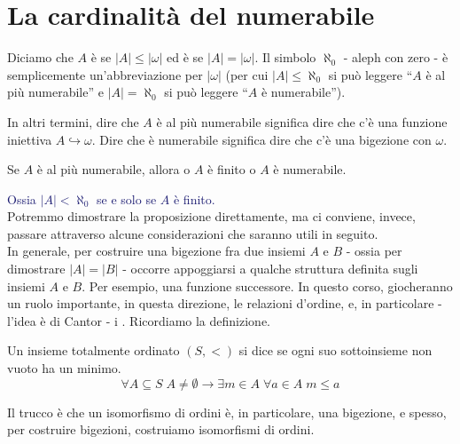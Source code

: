 \section{La cardinalità del numerabile}

\begin{definition}[Numerabilità]
	Diciamo che $A$ è  se $|A| \leq |\omega|$ ed è  se $|A| = |\omega|$.
	Il simbolo $\aleph_0$ - aleph con zero - è semplicemente un'abbreviazione per $|\omega|$ (per cui $|A| \leq \aleph_0$ si può leggere ``$A$ è al più numerabile'' e $|A| = \aleph_0$ si 
	può leggere ``$A$ è numerabile'').
\end{definition}

\begin{remark}
	In altri termini, dire che $A$ è al più numerabile significa dire che c'è una funzione iniettiva $A \hookrightarrow \omega$. Dire che è numerabile significa dire che c'è una bigezione con $\omega$.
\end{remark}

\begin{proposition}
	Se $A$ è al più numerabile, allora o $A$ è finito o $A$ è numerabile.
\end{proposition}

\textcolor{MidnightBlue}{Ossia $|A| < \aleph_0$ se e solo se $A$ è finito.}\\
Potremmo dimostrare la proposizione direttamente, ma ci conviene, invece, passare attraverso alcune considerazioni che saranno utili in seguito.\\
In generale, per costruire una bigezione fra due insiemi $A$ e $B$ - ossia per dimostrare $|A| = |B|$ - occorre appoggiarsi a qualche struttura definita sugli insiemi $A$
e $B$. Per esempio, una funzione successore. In questo corso, giocheranno un ruolo importante, in questa direzione, le relazioni d'ordine, e, in particolare - l'idea è di Cantor - i 
. Ricordiamo la definizione.

\begin{definition}
	Un insieme totalmente ordinato $(S,<)$ si dice  se ogni suo sottoinsieme non vuoto ha un minimo.
	\[ \forall A \subseteq S \; A \ne \emptyset \rightarrow \exists m \in A \; \forall a \in A \; m \leq a
		\]
\end{definition}

Il trucco è che un isomorfismo di ordini è, in particolare, una bigezione, e spesso, per costruire bigezioni, costruiamo isomorfismi di ordini.

